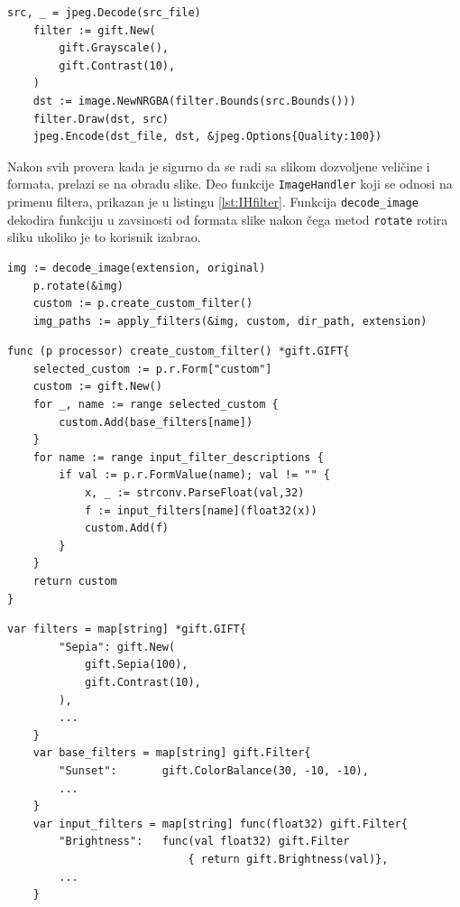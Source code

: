 \documentclass[12pt,oneside]{memoir}
\begin{document}
\begin{center}
\begin{lstlisting}[caption=Definisanje i primena filtera,label={lst:gift},  backgroundcolor=\color{background}]
	src, _ = jpeg.Decode(src_file)
	filter := gift.New(
		gift.Grayscale(),
		gift.Contrast(10),
	)
	dst := image.NewNRGBA(filter.Bounds(src.Bounds()))
	filter.Draw(dst, src)
	jpeg.Encode(dst_file, dst, &jpeg.Options{Quality:100})
\end{lstlisting}
\end{center}

Nakon svih provera kada je sigurno da se radi sa slikom dozvoljene veličine i formata, prelazi se na obradu slike. Deo funkcije  \texttt{ImageHandler} koji se odnosi na primenu filtera, prikazan je u listingu \ref{lst:IHfilter}. Funkcija  \texttt{decode\_image} dekodira funkciju u zavsinosti od formata slike nakon čega metod  \texttt{rotate} rotira sliku ukoliko je to korisnik izabrao. 

\begin{center}
\begin{lstlisting}[caption=Primena filtera u funkciji ImageHandler,label={lst:IHfilter},  backgroundcolor=\color{background}]
	img := decode_image(extension, original)
	p.rotate(&img)
	custom := p.create_custom_filter()
	img_paths := apply_filters(&img, custom, dir_path, extension)
\end{lstlisting}
\end{center}

\begin{center}
\begin{lstlisting}[caption=Funkcija za kreiranje zadatog filtera,label={lst:custom}, backgroundcolor=\color{background},belowskip=-0.8 \baselineskip]
func (p processor) create_custom_filter() *gift.GIFT{
	selected_custom := p.r.Form["custom"]
	custom := gift.New()
	for _, name := range selected_custom {
		custom.Add(base_filters[name])
	}
	for name := range input_filter_descriptions {
		if val := p.r.FormValue(name); val != "" {
			x, _ := strconv.ParseFloat(val,32)
			f := input_filters[name](float32(x))
			custom.Add(f)
		}
	}
	return custom
}
\end{lstlisting}
\end{center}

\begin{center}
\begin{lstlisting}[caption=Mape koje se koriste za definisanje različitih vrsta filtera,label={lst:maps},  backgroundcolor=\color{background}]
	var filters = map[string] *gift.GIFT{
		"Sepia": gift.New(
			gift.Sepia(100),
			gift.Contrast(10),
		),
		...
	}
	var base_filters = map[string] gift.Filter{
		"Sunset":      	gift.ColorBalance(30, -10, -10),
		...
	}
	var input_filters = map[string] func(float32) gift.Filter{
		"Brightness":	func(val float32) gift.Filter 
							{ return gift.Brightness(val)},
		...
	}
\end{lstlisting}
\end{center}
\end{document}
